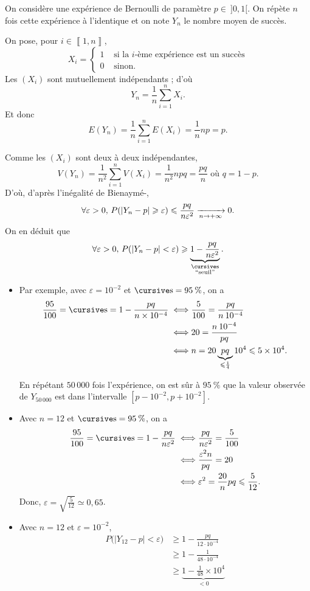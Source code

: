 \begin{rmk}[Application]
	On considère une expérience de Bernoulli de paramètre $p \in \:]0,1[$.
	On répète $n$ fois cette expérience à l'identique et on note $Y_n$ le nombre moyen de succès.

	On pose, pour $i \in \left\llbracket 1,n \right\rrbracket$, \[
		X_i = \begin{cases}
			1 &\text{ si la $i$-ème expérience est un succès}\\
			0 &\text{ sinon}.
		\end{cases}
	\]
	Les $(X_i)$ sont mutuellement indépendants ; d'où \[
		Y_n = \frac{1}{n} \sum_{i=1}^n X_i
	.\] Et donc \[
		E(Y_n) = \frac{1}{n} \sum_{i=1}^n E(X_i) = \frac{1}{n}np = p
	.\]

	Comme les $(X_i)$ sont deux à deux indépendantes, \[
		V(Y_n) = \frac{1}{n^2} \sum_{i=1}^n V(X_i) = \frac{1}{n^2}npq = \frac{pq}{n} \text{ où } q = 1 - p
	.\]
	D'où, d'après l'inégalité de Bienaymé-\Tchebychev,  \[
		\forall \varepsilon > 0,\,P(|Y_n - p| \geqslant \varepsilon) \leqslant \frac{pq}{n \varepsilon^2} \xrightarrow[n\to +\infty]{} 0
	.\] On en déduit que \[
		\forall \varepsilon > 0,\,P(|Y_n - p| < \varepsilon) \ge \underbrace{1 - \frac{pq}{n\varepsilon^2}}_{\substack{\s\\\text{``seuil''}}}
	.\]

	\begin{itemize}
		\item Par exemple, avec $\varepsilon = 10^{-2}$ et $\s = 95\:\%$, on a
			\begin{align*}
				\frac{95}{100} = \s = 1 - \frac{pq}{n\times 10^{-4}} \iff&
				\frac{5}{100} = \frac{pq}{n\:10^{-4}}\\
				\iff& 20 = \frac{n\:10^{-4}}{pq}\\
				\iff& n = 20\underbrace{pq}_{\le \frac{1}{4}}10^4 \le 5\times 10^{4}.
			\end{align*}

			En répétant $50\,000$ fois l'expérience, on est sûr à $95\:\%$ que la valeur observée de $Y_{50\,000}$ est dans l'intervalle $\left[ p-10^{-2},p+10^{-2} \right]$.
		\item Avec $n = 12$ et $\s = 95\:\%$, on a
			\begin{align*}
				\frac{95}{100} = \s = 1 - \frac{pq}{n \varepsilon^2} \iff& \frac{pq}{n\varepsilon^2} = \frac{5}{100}\\
				\iff& \frac{\varepsilon^2 n}{pq} = 20\\
				\iff& \varepsilon^2 = \frac{20}{n} pq \le \frac{5}{12}.
			\end{align*}
			Donc, $\varepsilon = \sqrt{\frac{5}{12}} \simeq 0,\!65$.
		\item Avec $n = 12$ et $\varepsilon = 10^{-2}$,
			\begin{align*}
				P\big(|Y_{12}-p| < \varepsilon\big) &\ge 1 - \frac{pq}{12\cdot 10^{-4}}\\
				&\ge 1 - \frac{1}{48\cdot 10^{-4}}\\
				&\ge \underbrace{1 - \frac{1}{48}\times 10^{4}}_{< 0}
			\end{align*}
	\end{itemize}
\end{rmk}


